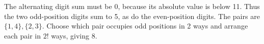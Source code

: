 The alternating digit sum must be 0, because its absolute value is below 11. Thus the two odd-position digits sum to 5, as do the even-position digits. The pairs are $\{1,4\},\{2,3\}$. Choose which pair occupies odd positions in 2 ways and arrange each pair in $ 2!$ ways, giving $\boxed8 $.
